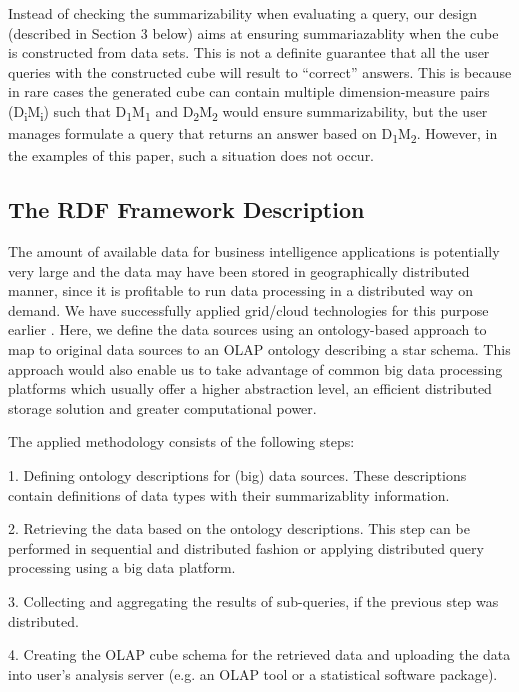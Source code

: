 \documentclass[USenglish,twocolumn]{article}
\begin{document}
Instead of checking the summarizability when evaluating a query, our
design (described in Section 3 below) aims at ensuring summariazablity
when the cube is constructed from data sets. This is not a definite
guarantee that all the user queries with the constructed cube will
result to ``correct'' answers. This is because in rare cases the
generated cube can contain multiple dimension-measure pairs (D\textsubscript{i}M\textsubscript{i}) such
that D\textsubscript{1}M\textsubscript{1} and
D\textsubscript{2}M\textsubscript{2} would ensure summarizability, but
the user manages formulate a query that returns an answer based on
D\textsubscript{1}M\textsubscript{2}. However, in the examples of this
paper, such a situation does not occur.

\subsection{The RDF Framework Description}\label{the-rdf-framework-description}

The amount of available data for business intelligence applications is
potentially very large and the data may have been stored in
geographically distributed manner, since it is profitable to run data
processing in a distributed way on demand. We have successfully applied
grid/cloud technologies for this purpose earlier \cite{Nii09}. Here, we define the
data sources using an ontology-based approach to map to original data
sources to an OLAP ontology describing a star schema. This approach
would also enable us to take advantage of common big data processing
platforms which usually offer a higher abstraction level, an efficient
distributed storage solution and greater computational power.

The applied methodology consists of the following steps:

1. Defining ontology descriptions for (big) data sources. These
descriptions contain definitions of data types with their summarizablity
information.

2. Retrieving the data based on the ontology descriptions. This step can
be performed in sequential and distributed fashion or applying
distributed query processing using a big data platform.

3. Collecting and aggregating the results of sub-queries, if the
previous step was distributed.

4. Creating the OLAP cube schema for the retrieved data and uploading
the data into user's analysis server (e.g. an OLAP tool or a statistical
software package).
\end{document}
